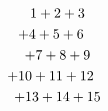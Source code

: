 \setlength\multlinegap{3em}
\setlength\multlinetaggap{3em}
\begin{multline*}
1+2+3 \\ \shoveleft{+4+5+6} \\
+7+8+9 \\
\shoveright{+10+11+12} \\ +13+14+15
\end{multline*}
